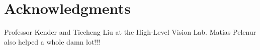 \documentclass{sig-alternate}
\begin{document}
\section{Acknowledgments}
Professor Kender and Tiecheng Liu at the High-Level Vision Lab.
Matias Pelenur also helped a whole damn lot!!!




% 


\balancecolumns %
\end{document}
